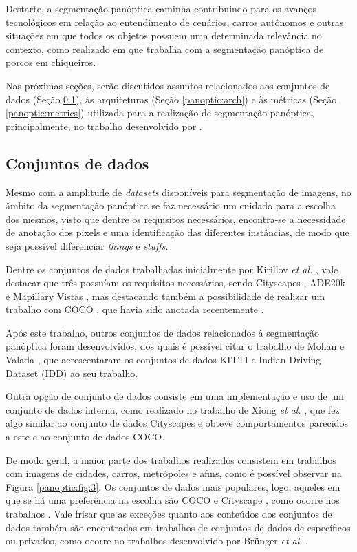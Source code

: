 Destarte, a segmentação panóptica caminha contribuindo para os avanços tecnológicos em relação ao entendimento de cenários, carros autônomos \cite{Liu2019} e outras situações em que todos os objetos possuem uma determinada relevância no contexto, como realizado em \cite{Brunger2020} que trabalha com a segmentação panóptica de porcos em chiqueiros.

Nas próximas seções, serão discutidos assuntos relacionados aos conjuntos de dados (Seção \ref{panoptic:dataset}), às arquiteturas (Seção \ref{panoptic:arch}) e às métricas (Seção \ref{panoptic:metrics}) utilizada para a realização de segmentação panóptica, principalmente, no trabalho desenvolvido por \cite{Kirillov2019a}.


\subsection{Conjuntos de dados}
\label{panoptic:dataset}
Mesmo com a amplitude de \textit{datasets} disponíveis para segmentação de imagens, no âmbito da segmentação panóptica se faz necessário um cuidado para a escolha dos mesmos, visto que dentre os requisitos necessários, encontra-se a necessidade de anotação dos pixels e uma identificação das diferentes instâncias, de modo que seja possível diferenciar \textit{things} e \textit{stuffs}.

Dentre os conjuntos de dados trabalhadas inicialmente por Kirillov \textit{et al.} \cite{Kirillov2019a}, vale destacar que três possuíam os requisitos necessários, sendo Cityscapes \cite{Cordts2016}, ADE20k \cite{Zhou2016} e Mapillary Vistas \cite{Neuhold2017_ICCV}, mas destacando também a possibilidade de realizar um trabalho com COCO \cite{Lin2014}, que havia sido anotada recentemente \cite{Kirillov2019a}.

Após este trabalho, outros conjuntos de dados relacionados à segmentação panóptica foram desenvolvidos, dos quais é possível citar o trabalho de Mohan e Valada \cite{Mohan2020}, que acrescentaram os conjuntos de dados KITTI \cite{Geiger2013} e Indian Driving Dataset (IDD) \cite{Varma2018} ao seu trabalho.

Outra opção de conjunto de dados consiste em uma implementação e uso de um conjunto de dados interna, como realizado no trabalho de Xiong \textit{et al.} \cite{Xiong2019}, que fez algo similar ao conjunto de dados Cityscapes e obteve comportamentos parecidos a este e ao conjunto de dados COCO.

De modo geral, a maior parte dos trabalhos realizados consistem em trabalhos com imagens de cidades, carros, metrópoles e afins, como é possível observar na Figura \ref{panoptic:fig:3}. Os conjuntos de dados mais populares, logo, aqueles em que se há uma preferência na escolha são COCO \cite{Caesar2016, Lin2014} e Cityscape \cite{Cordts2016}, como ocorre nos trabalhos \cite{Chen2019, DeGeus2019a, DeGeus2019, Hou2019, Liu2019, Xiong2019}. Vale frisar que as exceções quanto aos conteúdos dos conjuntos de dados também são encontradas em trabalhos de conjuntos de dados de específicos ou privados, como ocorre no trabalhos desenvolvido por Brünger \textit{et al.} \cite{Brunger2020}.

